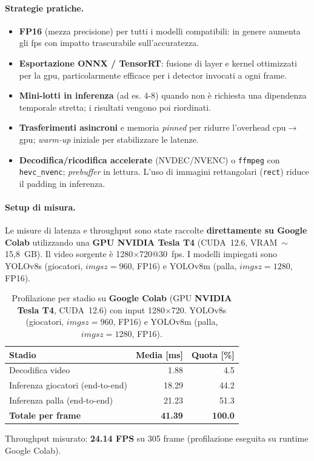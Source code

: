 \documentclass[12pt,a4paper,openright,twoside]{book}
\begin{document}
\paragraph{Strategie pratiche.}
\begin{itemize}
  \item \textbf{FP16} (mezza precisione) per tutti i modelli compatibili: in genere aumenta gli \ac{fps}
  con impatto trascurabile sull'accuratezza.
  \item \textbf{Esportazione ONNX / TensorRT}: fusione di layer e kernel ottimizzati per la \ac{gpu},
  particolarmente efficace per i detector invocati a ogni frame.
  \item \textbf{Mini-lotti in inferenza} (ad es. 4-8) quando non è richiesta una dipendenza temporale stretta; i risultati vengono poi riordinati.
  \item \textbf{Trasferimenti asincroni} e memoria \emph{pinned} per ridurre l'overhead
  \ac{cpu}$\to$\ac{gpu}; \emph{warm-up} iniziale per stabilizzare le latenze.
  \item \textbf{Decodifica/ricodifica accelerate} (NVDEC/NVENC) o \texttt{ffmpeg} con
  \texttt{hevc\_nvenc}; \emph{prebuffer} in lettura. L'uso di immagini rettangolari (\texttt{rect})
  riduce il padding in inferenza.
\end{itemize}

\paragraph{Setup di misura.}
Le misure di latenza e throughput sono state raccolte \textbf{direttamente su Google Colab} utilizzando una
\textbf{GPU NVIDIA Tesla T4} (CUDA~12.6, VRAM~$\sim$15{,}8~GB). Il video sorgente è 1280$\times$720@30~fps.
I modelli impiegati sono YOLOv8s (giocatori, $imgsz{=}960$, FP16) e YOLOv8m (palla, $imgsz{=}1280$, FP16).

\begin{table}[h]
  \centering
  \caption{Profilazione per stadio su \textbf{Google Colab} (GPU \textbf{NVIDIA Tesla T4}, CUDA~12.6) con input 1280$\times$720.
  YOLOv8s (giocatori, $imgsz{=}960$, FP16) e YOLOv8m (palla, $imgsz{=}1280$, FP16).}
  \label{tab:latenze_profiling_t4}
  \begin{tabular}{lrr}
    \toprule
    \textbf{Stadio} & \textbf{Media [ms]} & \textbf{Quota [\%]} \\
    \midrule
    Decodifica video & 1.88 & 4.5 \\
    Inferenza giocatori (end-to-end) & 18.29 & 44.2 \\
    Inferenza palla (end-to-end) & 21.23 & 51.3 \\
    \midrule
    \textbf{Totale per frame} & \textbf{41.39} & \textbf{100.0} \\
    \bottomrule
  \end{tabular}
  \vspace{0.3em}

  \small Throughput misurato: \textbf{24.14 FPS} su 305 frame (profilazione eseguita su runtime Google Colab).
\end{table}
\end{document}
